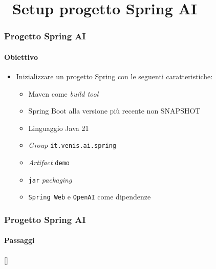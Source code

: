 \section{\faWrench\ Setup progetto Spring AI} %
\label{sec:spring-ai-project-setup}
%
\begin{frame}[t,fragile] \frametitle{Progetto Spring AI}
    \framesubtitle{Obiettivo}
    \begin{itemize}[leftmargin=10pt,align=right]
        \item[\alert{\faArrowCircleRight}] Inizializzare un progetto Spring con le seguenti caratteristiche:     
        \begin{itemize}[leftmargin=10pt,align=right]
            \item[\alert{\faArrowCircleRight}] \alert{Maven} come \textit{build tool}
            \item[\alert{\faArrowCircleRight}] Spring Boot alla versione più recente \alert{non SNAPSHOT}
            \item[\alert{\faArrowCircleRight}] Linguaggio \alert{Java 21}
            \item[\alert{\faArrowCircleRight}] \textit{Group} \alert{\texttt{it.venis.ai.spring}}
            \item[\alert{\faArrowCircleRight}] \textit{Artifact} \alert{\texttt{demo}}
            \item[\alert{\faArrowCircleRight}] \alert{\texttt{jar}} \textit{packaging}
            \item[\alert{\faArrowCircleRight}] \alert{\texttt{Spring Web}} e \alert{\texttt{OpenAI}} come dipendenze
        \end{itemize}
    \end{itemize}
\end{frame}
%
\begin{frame}[t,fragile] \frametitle{Progetto Spring AI}
    \framesubtitle{Passaggi}
    []
    \tableofcontents[sections={2}]
\end{frame}
%
